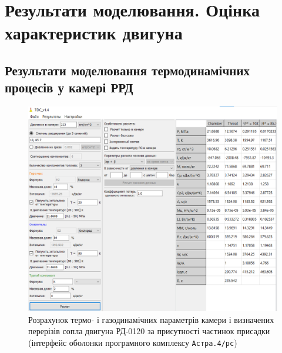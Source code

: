 \chapter{Результати моделювання. Оцінка характеристик двигуна}\label{sec:model_results}

\section{Результати моделювання термодинамічних процесів у камері РРД}


\begin{figure}
	\centering
	\includegraphics[width=0.5\textheight, angle=0,origin=c]{chapter_3/RD-0120_add.png}
	\caption{Розрахунок термо- і газодинамічних параметрів камери і визначених перерізів сопла двигуна РД-0120 за присутності частинок присадки (інтерфейс оболонки програмного комплексу \texttt{Астра.4/рс})}
	\label{fig:RD-0120_add}
\end{figure}

